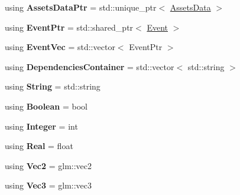 \begin{DoxyCompactItemize}
\item 
\hypertarget{namespaceDCEngine_a12e205085db7ea45f6b425edb9562a1f}{using {\bfseries Assets\-Data\-Ptr} = std\-::unique\-\_\-ptr$<$ \hyperlink{structDCEngine_1_1AssetsData}{Assets\-Data} $>$}\label{namespaceDCEngine_a12e205085db7ea45f6b425edb9562a1f}

\item 
\hypertarget{namespaceDCEngine_a2f893e17483e3faed67f5705ce6c2158}{using {\bfseries Event\-Ptr} = std\-::shared\-\_\-ptr$<$ \hyperlink{classDCEngine_1_1Event}{Event} $>$}\label{namespaceDCEngine_a2f893e17483e3faed67f5705ce6c2158}

\item 
\hypertarget{namespaceDCEngine_a6e1d160a641b4328c8105ce0265e2d7d}{using {\bfseries Event\-Vec} = std\-::vector$<$ Event\-Ptr $>$}\label{namespaceDCEngine_a6e1d160a641b4328c8105ce0265e2d7d}

\item 
\hypertarget{namespaceDCEngine_a296ff859cad2cc4039d29c128d83d64a}{using {\bfseries Dependencies\-Container} = std\-::vector$<$ std\-::string $>$}\label{namespaceDCEngine_a296ff859cad2cc4039d29c128d83d64a}

\item 
\hypertarget{namespaceDCEngine_a19eb2c9748fb95ede3cb4d48e64ba3f7}{using {\bfseries String} = std\-::string}\label{namespaceDCEngine_a19eb2c9748fb95ede3cb4d48e64ba3f7}

\item 
\hypertarget{namespaceDCEngine_aea92d510917d38732798d51238ba0068}{using {\bfseries Boolean} = bool}\label{namespaceDCEngine_aea92d510917d38732798d51238ba0068}

\item 
\hypertarget{namespaceDCEngine_ade4d197c8bc1c91df766a7774104f932}{using {\bfseries Integer} = int}\label{namespaceDCEngine_ade4d197c8bc1c91df766a7774104f932}

\item 
\hypertarget{namespaceDCEngine_ac6036335e7433d3887d8dd39cbc860d8}{using {\bfseries Real} = float}\label{namespaceDCEngine_ac6036335e7433d3887d8dd39cbc860d8}

\item 
\hypertarget{namespaceDCEngine_a665a3eb8eea4d6bdb5c54133409aad29}{using {\bfseries Vec2} = glm\-::vec2}\label{namespaceDCEngine_a665a3eb8eea4d6bdb5c54133409aad29}

\item 
\hypertarget{namespaceDCEngine_a01daba425800ce769f7bed214ef1929d}{using {\bfseries Vec3} = glm\-::vec3}\label{namespaceDCEngine_a01daba425800ce769f7bed214ef1929d}


\end{DoxyCompactItemize}
